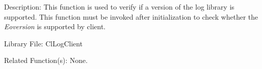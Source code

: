 \begin{Desc}
\item[Description:]This function is used to verify if a version of the log library is supported. This function must be invoked after initialization to check whether the {\em Eoversion\/} is supported by client.\end{Desc}
\begin{Desc}
\item[Library File:]Cl\-Log\-Client\end{Desc}
\begin{Desc}
\item[Related Function(s):]None. \end{Desc}







